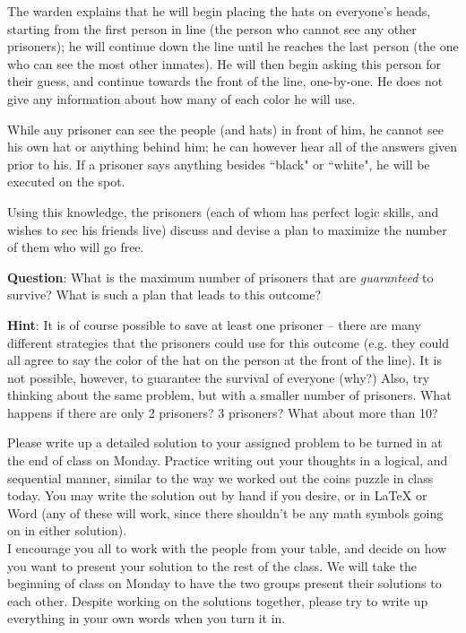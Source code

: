 \documentclass[12pt]{article}
\numberwithin{equation}{subsection}
\begin{document}
\begin{enumerate}
The warden explains that he will begin placing the hats on everyone's heads, starting from the first person in line (the person who cannot see any other prisoners); he will continue down the line until he reaches the last person (the one who can see the most other inmates).  He will then begin asking this person for their guess, and continue towards the front of the line, one-by-one. He does not give any information about how many of each color he will use.

While any prisoner can see the people (and hats) in front of him, he cannot see his own hat or anything behind him; he can however hear all of the answers given prior to his. If a prisoner says anything besides ``black" or ``white", he will be executed on the spot.

Using this knowledge, the prisoners (each of whom has perfect logic skills, and wishes to see his friends live) discuss and devise a plan to maximize the number of them who will go free.

\textbf{Question}: What is the maximum number of prisoners that are \emph{guaranteed} to survive? What is such a plan that leads to this outcome?

\textbf{Hint}: It is of course possible to save at least one prisoner -- there are many different strategies that the prisoners could use for this outcome (e.g. they could all agree to say the color of the hat on the person at the front of the line). It is not possible, however, to guarantee the survival of everyone (why?) Also, try thinking about the same problem, but with a smaller number of prisoners. What happens if there are only 2 prisoners? 3 prisoners? What about more than 10?
\end{enumerate}

\noindent\makebox[\linewidth]{\rule{\paperwidth}{0.4pt}}

\vspace{0.5cm}

Please write up a detailed solution to your assigned problem to be turned in at the end of class on Monday. Practice writing out your thoughts in a logical, and sequential manner, similar to the way we worked out the coins puzzle in class today. You may write the solution out by hand if you desire, or in {\LaTeX} or Word (any of these will work, since there shouldn't be any math symbols going on in either solution).\\


I encourage you all to work with the people from your table, and decide on how you want to present your solution to the rest of the class. We will take the beginning of class on Monday to have the two groups present their solutions to each other. Despite working on the solutions together, please try to write up everything in your own words when you turn it in.
\end{document}

